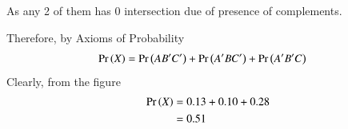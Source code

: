 \documentclass[journal,12pt,twocolumn]{IEEEtran}
\begin{document}
\begin{enumerate}[label=(\alph*)]
As any 2 of them has 0 intersection due of presence of complements.

Therefore, by Axioms of Probability
\begin{align}
    \Pr\left(X\right)&=\Pr\left(AB^\prime C^\prime\right)+\Pr\left(A^\prime BC^\prime\right)+\Pr\left(A^\prime B^\prime C\right)
\end{align}
Clearly, from the figure
\begin{align}
    \Pr\left(X\right)&=0.13+0.10+0.28\\
    &=0.51
\end{align}

\end{enumerate}
\end{document}

